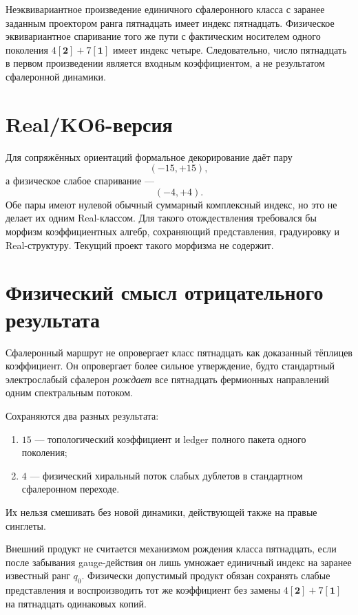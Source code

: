 \begin{theorem}
Неэквивариантное произведение единичного сфалеронного класса с заранее
заданным проектором ранга пятнадцать имеет индекс пятнадцать. Физическое
эквивариантное спаривание того же пути с фактическим носителем одного
поколения $4[\mathbf2]+7[\mathbf1]$ имеет индекс четыре. Следовательно,
число пятнадцать в первом произведении является входным коэффициентом,
а не результатом сфалеронной динамики.
\end{theorem}

\section{Real/KO6-версия}

Для сопряжённых ориентаций формальное декорирование даёт пару
\begin{equation}
 (-15,+15),
\end{equation}
а физическое слабое спаривание ---
\begin{equation}
 (-4,+4).
\end{equation}
Обе пары имеют нулевой обычный суммарный комплексный индекс, но это не
делает их одним Real-классом. Для такого отождествления требовался бы
морфизм коэффициентных алгебр, сохраняющий представления, градуировку и
Real-структуру. Текущий проект такого морфизма не содержит.

\section{Физический смысл отрицательного результата}

Сфалеронный маршрут не опровергает класс пятнадцать как доказанный
тёплицев коэффициент. Он опровергает более сильное утверждение, будто
стандартный электрослабый сфалерон \emph{рождает} все пятнадцать
фермионных направлений одним спектральным потоком.

Сохраняются два разных результата:
\begin{enumerate}
 \item $15$ --- топологический коэффициент и ledger полного пакета
 одного поколения;
 \item $4$ --- физический хиральный поток слабых дублетов в стандартном
 сфалеронном переходе.
\end{enumerate}
Их нельзя смешивать без новой динамики, действующей также на правые
синглеты.

\begin{nogocriterion}
Внешний продукт не считается механизмом рождения класса пятнадцать,
если после забывания gauge-действия он лишь умножает единичный индекс на
заранее известный ранг $q_0$. Физически допустимый продукт обязан
сохранять слабые представления и воспроизводить тот же коэффициент без
замены $4[\mathbf2]+7[\mathbf1]$ на пятнадцать одинаковых копий.
\end{nogocriterion}


